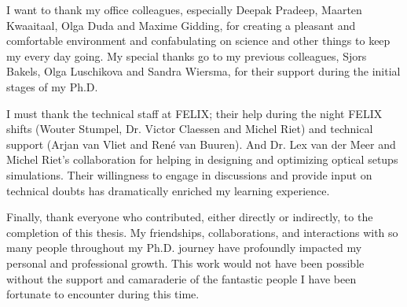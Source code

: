  I want to thank my office colleagues, especially Deepak Pradeep, Maarten Kwaaitaal, Olga Duda and Maxime Gidding, for creating a pleasant and comfortable environment and confabulating on science and other things to keep my every day going. My special thanks go to my previous colleagues, Sjors Bakels, Olga Luschikova and Sandra Wiersma, for their support during the initial stages of my Ph.D.

I must thank the technical staff at FELIX; their help during the night FELIX shifts (Wouter Stumpel, Dr. Victor Claessen and Michel Riet) and technical support (Arjan van Vliet and Ren\'{e} van Buuren). And Dr. Lex van der Meer and Michel Riet's collaboration for helping in designing and optimizing optical setups simulations. Their willingness to engage in discussions and provide input on technical doubts has dramatically enriched my learning experience.

Finally, thank everyone who contributed, either directly or indirectly, to the completion of this thesis. My friendships, collaborations, and interactions with so many people throughout my Ph.D. journey have profoundly impacted my personal and professional growth. This work would not have been possible without the support and camaraderie of the fantastic people I have been fortunate to encounter during this time.
